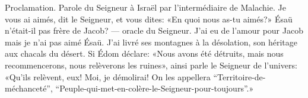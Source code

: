 Proclamation.
Parole du Seigneur à Israël par l’intermédiaire de Malachie.
Je vous ai aimés, dit le Seigneur, et vous dites:
	«En quoi nous as-tu aimés?»
	Ésaü n’était-il pas frère de Jacob?
	--- oracle du Seigneur.
J’ai eu de l’amour pour Jacob mais je n’ai pas aimé Ésaü.
	J’ai livré ses montagnes à la désolation, son héritage aux chacals du désert.
Si Édom déclare: «Nous avons été détruits,
	mais nous recommencerons, nous relèverons les ruines»,
	ainsi parle le Seigneur de l’univers:
	«Qu’ils relèvent, eux! Moi, je démolirai!
On les appellera “Territoire-de-méchanceté”,
	“Peuple-qui-met-en-colère-le-Seigneur-pour-toujours”.»
